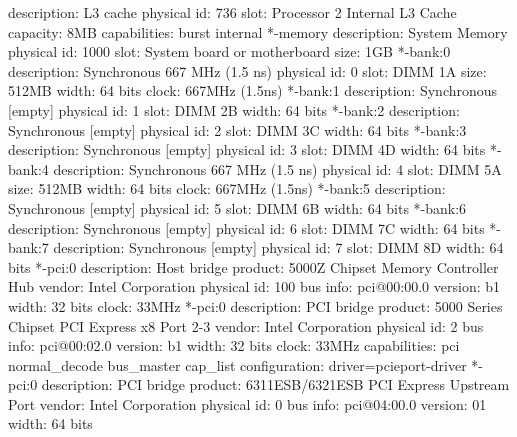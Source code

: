 \documentclass[mingoth,a4paper]{jsarticle}
\begin{document}
{{{{{{{{{\begin{commandline}
             description: L3 cache
             physical id: 736
             slot: Processor 2 Internal L3 Cache
             capacity: 8MB
             capabilities: burst internal
     *-memory
          description: System Memory
          physical id: 1000
          slot: System board or motherboard
          size: 1GB
        *-bank:0
             description: Synchronous 667 MHz (1.5 ns)
             physical id: 0
             slot: DIMM 1A
             size: 512MB
             width: 64 bits
             clock: 667MHz (1.5ns)
        *-bank:1
             description: Synchronous [empty]
             physical id: 1
             slot: DIMM 2B
             width: 64 bits
        *-bank:2
             description: Synchronous [empty]
             physical id: 2
             slot: DIMM 3C
             width: 64 bits
        *-bank:3
             description: Synchronous [empty]
             physical id: 3
             slot: DIMM 4D
             width: 64 bits
        *-bank:4
             description: Synchronous 667 MHz (1.5 ns)
             physical id: 4
             slot: DIMM 5A
             size: 512MB
             width: 64 bits
             clock: 667MHz (1.5ns)
        *-bank:5
             description: Synchronous [empty]
             physical id: 5
             slot: DIMM 6B
             width: 64 bits
        *-bank:6
             description: Synchronous [empty]
             physical id: 6
             slot: DIMM 7C
             width: 64 bits
        *-bank:7
             description: Synchronous [empty]
             physical id: 7
             slot: DIMM 8D
             width: 64 bits
     *-pci:0
          description: Host bridge
          product: 5000Z Chipset Memory Controller Hub
          vendor: Intel Corporation
          physical id: 100
          bus info: pci@00:00.0
          version: b1
          width: 32 bits
          clock: 33MHz
        *-pci:0
             description: PCI bridge
             product: 5000 Series Chipset PCI Express x8 Port 2-3
             vendor: Intel Corporation
             physical id: 2
             bus info: pci@00:02.0
             version: b1
             width: 32 bits
             clock: 33MHz
             capabilities: pci normal_decode bus_master cap_list
             configuration: driver=pcieport-driver
           *-pci:0
                description: PCI bridge
                product: 6311ESB/6321ESB PCI Express Upstream Port
                vendor: Intel Corporation
                physical id: 0
                bus info: pci@04:00.0
                version: 01
                width: 64 bits

\end{commandline}}}}}}}}}}
\end{document}
